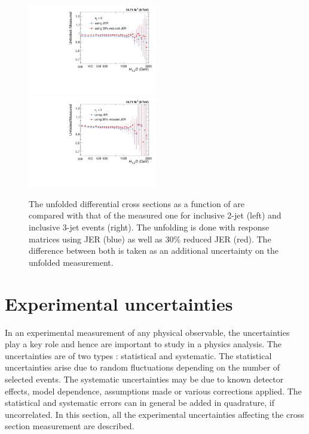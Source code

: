 \begin{figure}[!htp]
  \begin{center}
    \includegraphics[width=0.5\textwidth]{Plots_HT_2_150/Ratio_Unfolding_data_NLO_2.pdf}%
    \includegraphics[width=0.5\textwidth]{Plots_HT_2_150/Ratio_Unfolding_data_NLO_3.pdf}
    \caption{The unfolded differential cross sections as a function of \httwo are compared with that of the measured one for inclusive 2-jet (left) and inclusive 3-jet events (right). The unfolding is done with response matrices using JER (blue) as well as 30\% reduced JER (red). The difference between both is taken as an additional uncertainty on the unfolded measurement.}
    \label{fig:unfolded_data}
  \end{center}
\end{figure}

\section{Experimental uncertainties}
\label{sec:exp_unc}
In an experimental measurement of any physical observable, the uncertainties play a key role and hence are important to study in a physics analysis. The uncertainties are of two types : statistical and systematic. The statistical uncertainties arise due to random fluctuations depending on the number of selected events. The systematic uncertainties may be due to known detector effects, model dependence, assumptions
made or various corrections applied. The statistical and systematic errors can in general be added in quadrature, if uncorrelated. In this section, all the experimental uncertainties affecting the cross section measurement are described.

